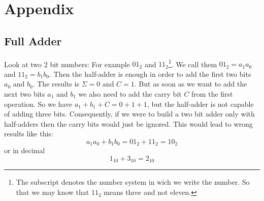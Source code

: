 \documentclass[10pt,a4paper]{article}
\begin{document}
	\section{Appendix}
	\subsection{Full Adder}\label{subsec:appendix-full-adder}
	
	Look at two 2 bit numbers: For example $01_2$ and $11_2$\footnote{The subscript denotes the number system in wich we write the number. So that we may know that $11_2$ means three and not eleven.}.  We call them $01_2 = a_1a_0$ and $11_2 = b_1b_0$. Then the half-adder is enough in order to add the first two bits $a_0$ and $b_0$. The results is $\Sigma=0$ and $C=1$. But as soon as we want to add the next two bits $a_1$ and $b_1$ we also need to add the carry bit $C$ from the first operation. So we have $a_1+b_1+C = 0 + 1 + 1$, but the half-adder is not capable of adding three bits. Consequently, if we were to build a two bit adder only with half-adders then the carry bits would just be ignored. This would lead to wrong results like this:
	\[
	a_1a_0 + b_1b_0 = 01_2 + 11_2 = 10_2
	\]
	or in decimal
	\[
	1_{10} + 3_{10} = 2_{10}
	\]
\end{document}
